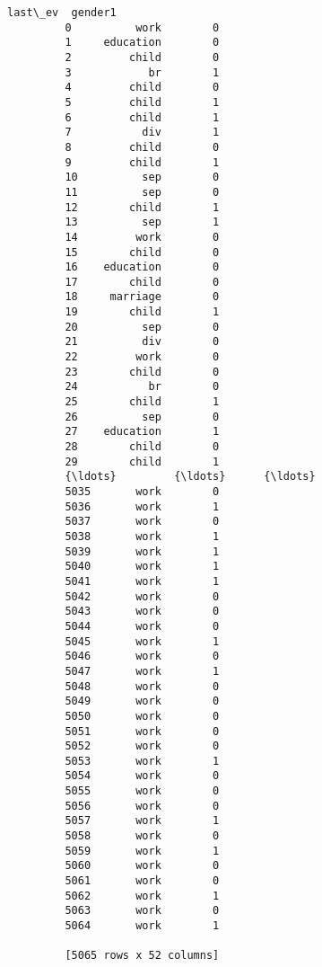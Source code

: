 \documentclass[11pt]{article}
\begin{document}
\begin{Verbatim}[commandchars=\\\{\}]
                 last\_ev  gender1  
         0          work        0  
         1     education        0  
         2         child        0  
         3            br        1  
         4         child        0  
         5         child        1  
         6         child        1  
         7           div        1  
         8         child        0  
         9         child        1  
         10          sep        0  
         11          sep        0  
         12        child        1  
         13          sep        1  
         14         work        0  
         15        child        0  
         16    education        0  
         17        child        0  
         18     marriage        0  
         19        child        1  
         20          sep        0  
         21          div        0  
         22         work        0  
         23        child        0  
         24           br        0  
         25        child        1  
         26          sep        0  
         27    education        1  
         28        child        0  
         29        child        1  
         {\ldots}         {\ldots}      {\ldots}  
         5035       work        0  
         5036       work        1  
         5037       work        0  
         5038       work        1  
         5039       work        1  
         5040       work        1  
         5041       work        1  
         5042       work        0  
         5043       work        0  
         5044       work        0  
         5045       work        1  
         5046       work        0  
         5047       work        1  
         5048       work        0  
         5049       work        0  
         5050       work        0  
         5051       work        0  
         5052       work        0  
         5053       work        1  
         5054       work        0  
         5055       work        0  
         5056       work        0  
         5057       work        1  
         5058       work        0  
         5059       work        1  
         5060       work        0  
         5061       work        0  
         5062       work        1  
         5063       work        0  
         5064       work        1  
         
         [5065 rows x 52 columns]
\end{Verbatim}
            
\end{document}
